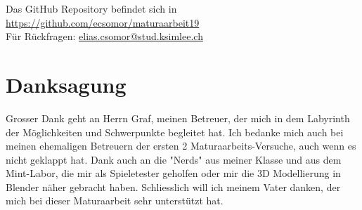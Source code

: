 Das GitHub Repository befindet sich in\\
\url{https://github.com/ecsomor/maturaarbeit19}\\
Für Rückfragen: \href{mailto:elias.csomor@stud.ksimlee.ch}{elias.csomor@stud.ksimlee.ch}

\section{Danksagung}
Grosser Dank geht an Herrn Graf, meinen Betreuer, der mich in dem Labyrinth der Möglichkeiten und Schwerpunkte begleitet hat.
Ich bedanke mich auch bei meinen ehemaligen Betreuern der ersten 2 Maturaarbeits-Versuche, auch wenn es nicht geklappt hat.
Dank auch an die "Nerds" aus meiner Klasse und aus dem Mint-Labor, die mir als Spieletester geholfen oder mir die 3D Modellierung in Blender näher gebracht haben.
Schliesslich will ich meinem Vater danken, der mich bei dieser Maturaarbeit sehr unterstützt hat.